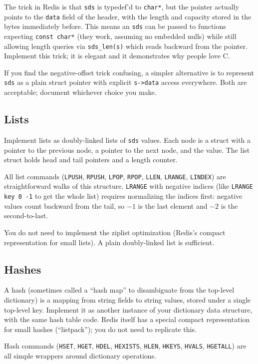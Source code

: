 \documentclass[11pt,a4paper]{article}
\begin{document}
The trick in Redis is that \texttt{sds} is typedef'd to \texttt{char*}, but the pointer actually points to the \texttt{data} field of the header, with the length and capacity stored in the bytes immediately before. This means an \texttt{sds} can be passed to functions expecting \texttt{const char*} (they work, assuming no embedded nulls) while still allowing length queries via \texttt{sds\_len(s)} which reads backward from the pointer. Implement this trick; it is elegant and it demonstrates why people love C.

If you find the negative-offset trick confusing, a simpler alternative is to represent \texttt{sds} as a plain struct pointer with explicit \texttt{s->data} access everywhere. Both are acceptable; document whichever choice you make.

\subsection{Lists}
Implement lists as doubly-linked lists of \texttt{sds} values. Each node is a struct with a pointer to the previous node, a pointer to the next node, and the value. The list struct holds head and tail pointers and a length counter.

All list commands (\texttt{LPUSH}, \texttt{RPUSH}, \texttt{LPOP}, \texttt{RPOP}, \texttt{LLEN}, \texttt{LRANGE}, \texttt{LINDEX}) are straightforward walks of this structure. \texttt{LRANGE} with negative indices (like \texttt{LRANGE key 0 -1} to get the whole list) requires normalizing the indices first: negative values count backward from the tail, so $-1$ is the last element and $-2$ is the second-to-last.

You do not need to implement the ziplist optimization (Redis's compact representation for small lists). A plain doubly-linked list is sufficient.

\subsection{Hashes}
A hash (sometimes called a ``hash map'' to disambiguate from the top-level dictionary) is a mapping from string fields to string values, stored under a single top-level key. Implement it as another instance of your dictionary data structure, with the same hash table code. Redis itself has a special compact representation for small hashes (``listpack''); you do not need to replicate this.

Hash commands (\texttt{HSET}, \texttt{HGET}, \texttt{HDEL}, \texttt{HEXISTS}, \texttt{HLEN}, \texttt{HKEYS}, \texttt{HVALS}, \texttt{HGETALL}) are all simple wrappers around dictionary operations.
\end{document}
